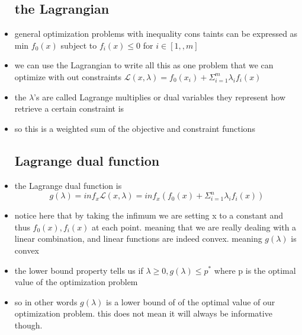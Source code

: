 \documentclass{article}
\begin{document}
\begin{itemize}
\subsection{the Lagrangian}
\item general optimization problems with inequality cons taints can be expressed as min $f_{0}(x)$ subject to $f_i(x)\leq 0 $ for $i\in[1,,m]$
\item we can use the Lagrangian to write all this as one problem that we can optimize with out constraints $\mathcal{L}(x,\lambda)=f_{0}(x_i)+\Sigma_{i=1}^{m}\lambda_{i}f_{i}(x) $
\item the $\lambda$'s are called Lagrange multiplies or dual variables they represent how retrieve a certain constraint is
\item so this is a weighted sum of the objective and constraint functions
\subsection{Lagrange dual function}
\item the Lagrange dual function is $$g(\lambda)=inf_{x}\mathcal{L}(x,\lambda)=inf_{x}(f_{0}(x)+\Sigma_{i=1}^{n}\lambda_if_i(x))$$
\item notice here that by taking the infimum we are setting x to a constant and thus $f_{0}(x),f_i(x)$ at each point. meaning that we are really dealing with a linear combination, and linear functions are indeed convex. meaning $g(\lambda)$ is convex
\item the lower bound property tells us if $\lambda\geq 0, g(\lambda)\leq p^{*} $ where p is the optimal value of the optimization problem 
\item so in other words $g(\lambda)$ is a lower bound of of the optimal value of our optimization problem. this does not mean it will always be informative though. 

\end{itemize}
\end{document}
